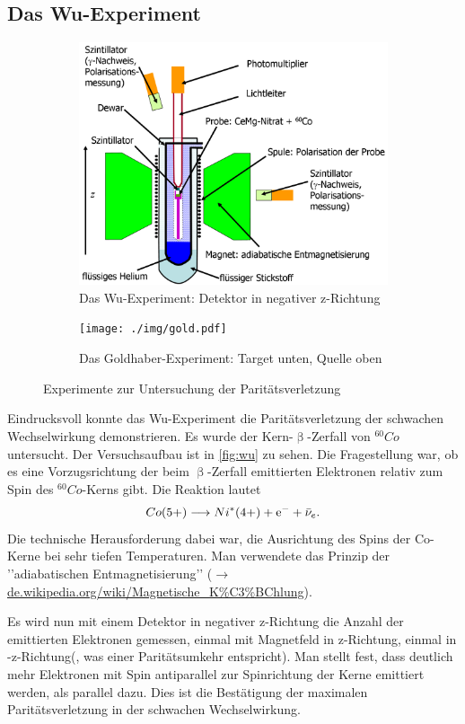 \subsection{Das Wu-Experiment}
\begin{figure}
	\centering
	\begin{subfigure}{0.5\textwidth}
		\centering
		\includegraphics[width=.5\textwidth]{./img/wu.jpg}
		\caption{Das Wu-Experiment: Detektor in negativer z-Richtung}
		\label{fig:wu}
	\end{subfigure}
	\begin{subfigure}{0.4\textwidth}
		\centering
		\texttt{[image: ./img/gold.pdf]}
		\caption{Das Goldhaber-Experiment: Target unten, Quelle oben}
		\label{fig:gold}
	\end{subfigure}
	\caption{Experimente zur Untersuchung der Paritätsverletzung}
\end{figure}
Eindrucksvoll konnte das Wu-Experiment die Paritätsverletzung der schwachen Wechselwirkung demonstrieren.
Es wurde der Kern-$\upbeta$-Zerfall von $^{60}Co$ untersucht.
Der Versuchsaufbau ist in \autoref{fig:wu} zu sehen.
Die Fragestellung war, ob es eine Vorzugsrichtung der beim $\upbeta$-Zerfall emittierten Elektronen relativ zum Spin des $^{60}Co$-Kerns gibt.
Die Reaktion lautet
\begin{equation*}
	Co(5+)\longrightarrow Ni^*(4+) + \text{e}^- + \bar{\nu}_e.
\end{equation*}
Die technische Herausforderung dabei war, die Ausrichtung des Spins der Co-Kerne bei sehr tiefen Temperaturen.
Man verwendete das Prinzip der ’’adiabatischen Entmagnetisierung’’ ($\rightarrow$ \url{de.wikipedia.org/wiki/Magnetische_K%C3%BChlung}).

Es wird nun mit einem Detektor in negativer z-Richtung die Anzahl der emittierten Elektronen gemessen, einmal mit Magnetfeld in z-Richtung, einmal in -z-Richtung(, was einer Paritätsumkehr entspricht).
Man stellt fest, dass deutlich mehr Elektronen mit Spin antiparallel zur Spinrichtung der Kerne emittiert werden, als parallel dazu.
Dies ist die Bestätigung der maximalen Paritätsverletzung in der schwachen Wechselwirkung.

